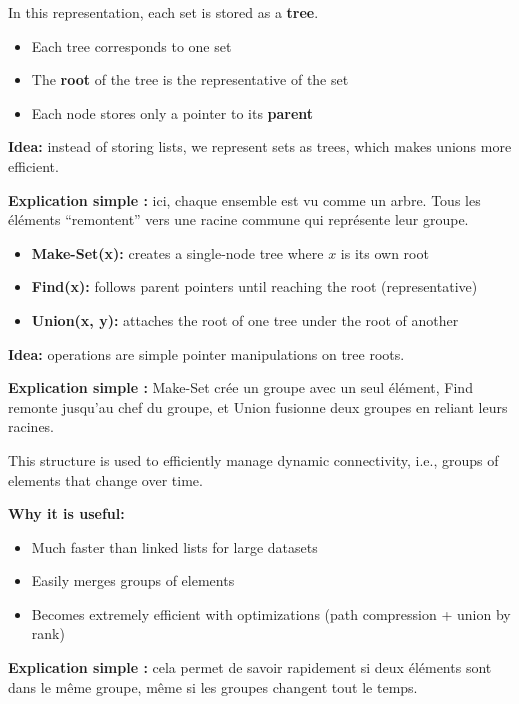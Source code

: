 \documentclass[11pt,a4paper,openany]{book}
\begin{document}
\begin{defnbox}[title=Disjoint-Set via Forest of Trees]
In this representation, each set is stored as a \textbf{tree}.

\begin{itemize}
    \item Each tree corresponds to one set
    \item The \textbf{root} of the tree is the representative of the set
    \item Each node stores only a pointer to its \textbf{parent}
\end{itemize}

\textbf{Idea:} instead of storing lists, we represent sets as trees, which makes unions more efficient.

\textbf{Explication simple :} ici, chaque ensemble est vu comme un arbre. Tous les éléments “remontent” vers une racine commune qui représente leur groupe.
\end{defnbox}

\begin{defnbox}[title=Operations]
\begin{itemize}
    \item \textbf{Make-Set(x):} creates a single-node tree where $x$ is its own root
    \item \textbf{Find(x):} follows parent pointers until reaching the root (representative)
    \item \textbf{Union(x, y):} attaches the root of one tree under the root of another
\end{itemize}

\textbf{Idea:} operations are simple pointer manipulations on tree roots.

\textbf{Explication simple :} Make-Set crée un groupe avec un seul élément, Find remonte jusqu’au chef du groupe, et Union fusionne deux groupes en reliant leurs racines.
\end{defnbox}

\begin{defnbox}[title=Intuition and Purpose]
This structure is used to efficiently manage dynamic connectivity, i.e., groups of elements that change over time.

\textbf{Why it is useful:}
\begin{itemize}
    \item Much faster than linked lists for large datasets
    \item Easily merges groups of elements
    \item Becomes extremely efficient with optimizations (path compression + union by rank)
\end{itemize}

\textbf{Explication simple :} cela permet de savoir rapidement si deux éléments sont dans le même groupe, même si les groupes changent tout le temps.
\end{defnbox}
\end{document}
